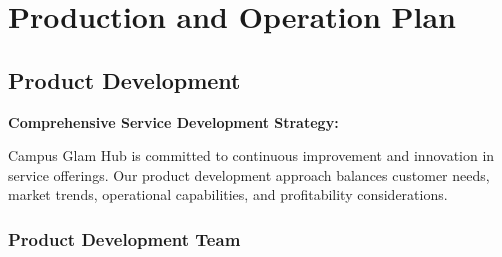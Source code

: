 \documentclass[a4paper,12pt]{article}
\begin{document}
\newpage
\section{Production and Operation Plan}

\subsection{Product Development}

\textbf{Comprehensive Service Development Strategy:}

Campus Glam Hub is committed to continuous improvement and innovation in service offerings. Our product development approach balances customer needs, market trends, operational capabilities, and profitability considerations.

\subsubsection{Product Development Team}
\end{document}
